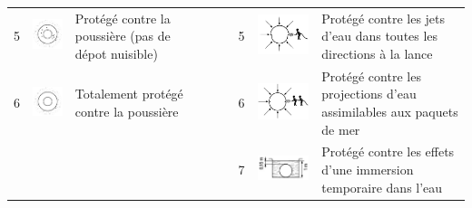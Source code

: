 \begin{xltabular}{\linewidth}{p{0.3cm} m{2cm} X p{0.3cm} m{2cm} X p{0.3cm} m{2.2cm} X}
5 		& 	\includegraphics[scale=1.1]{5X.png} & Protégé contre la poussière (pas de dépot nuisible)  	& 	& & & 5 & 	\includegraphics[scale=1.1]{X5.png}	&	Protégé contre les jets d'eau dans toutes les directions à la lance \\
6 		& 	\includegraphics[scale=1.1]{6X.png} & Totalement protégé contre la poussière 	& 	& & & 6 & 	\includegraphics[scale=1.1]{X6.png}	&	Protégé contre les projections d'eau assimilables aux paquets de mer \\
 		&  & 	& 	& & & 7 & 	\includegraphics[scale=1.1]{X7.png}	&	Protégé contre les effets d'une immersion temporaire dans l'eau \\

\end{xltabular}
